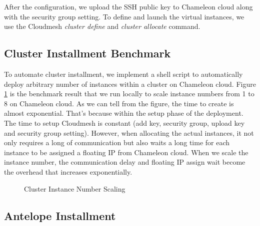 \documentclass[9pt,twocolumn,twoside]{../../styles/osajnl}
\begin{document}
After the configuration, we upload the SSH public key to Chameleon cloud along with the security group setting. To define and launch the virtual instances, we use the Cloudmesh \textit{cluster define}  and \textit{cluster allocate} command.

\subsection{Cluster Installment Benchmark}
To automate cluster installment, we implement a shell script to automatically deploy arbitrary number of instances within a cluster on Chameleon cloud.
Figure \ref{fig:cluster-deploy} is the benchmark result that we run locally to scale instance numbers from 1 to 8 on Chameleon cloud. As we can tell from the figure, the time to create is almost exponential. That's because within the setup phase of the deployment. The time to setup Cloudmesh is constant (add key, security group, upload key and security group setting). However, when allocating the actual instances, it not only requires a long of communication but also waits a long time for each instance to be assigned a floating IP from Chameleon cloud. When we scale the instance number, the communication delay and floating IP assign wait become the overhead that increases exponentially.

\begin{figure}[htbp]
\centering
{}
\caption{Cluster Instance Number Scaling}
\label{fig:cluster-deploy}
\end{figure}


\subsection{Antelope Installment}
\end{document}
